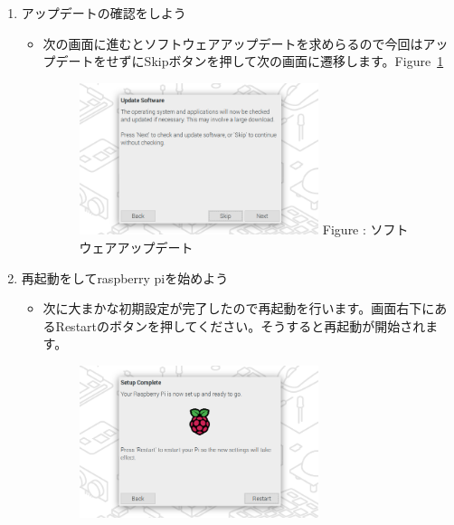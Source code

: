 \documentclass[a4paper,12pt]{jarticle}
\begin{document}
\begin{enumerate}
\begin{itemize}
                \end{itemize}  
   \clearpage           
    \item
        アップデートの確認をしよう
                \begin{itemize}
                  \item
                      次の画面に進むとソフトウェアアップデートを求めらるので今回はアップデートをせずにSkipボタンを押して次の画面に遷移します。Figure~\ref{seq:refFigure18}
                      \begin{figure}[h]
                        \centering
                        \begin{minipage}{5.228cm}
                          {\upshape
                            \includegraphics[width=7.000cm]{sw_image07.png}
                            \newline
                            Figure {\theFigure\label{seq:refFigure18}}:
                            ソフトウェアアップデート}
                        \end{minipage}
                      \end{figure}
                  \end{itemize}  
    \item
        再起動をしてraspberry piを始めよう
                \begin{itemize}
                  \item
                        次に大まかな初期設定が完了したので再起動を行います。画面右下にあるRestartのボタンを押してください。そうすると再起動が開始されます。
                        \begin{figure}[h]
                          \centering
                          \begin{minipage}{5.228cm}
                            {\upshape
                              \includegraphics[width=7.000cm]{sw_image08.png}
}
\end{minipage}
\end{figure}
\end{itemize}
\end{enumerate}
\end{document}
